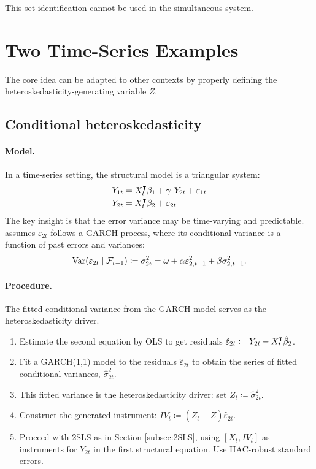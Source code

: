 This set-identification cannot be used in the simultaneous system.

\section{Two Time-Series Examples}

The core idea can be adapted to other contexts by properly defining
the heteroskedasticity-generating variable $Z$.

\subsection{Conditional heteroskedasticity \textcite{prono2014}}

\paragraph{Model.}

In a time-series setting, the structural model is a triangular system:
\begin{align*}
Y_{1t} & =X_{t}^{\intercal}\beta_{1}+\gamma_{1}Y_{2t}+\varepsilon_{1t}\\
Y_{2t} & =X_{t}^{\intercal}\beta_{2}+\varepsilon_{2t}
\end{align*}
The key insight is that the error variance may be time-varying and
predictable. \textcite{prono2014} assumes $\varepsilon_{2t}$ follows
a GARCH process, where its conditional variance is a function of past
errors and variances:
\[
\operatorname{Var}(\varepsilon_{2t}\mid\mathcal{F}_{t-1})\coloneqq\sigma_{2t}^{2}=\omega+\alpha\varepsilon_{2,t-1}^{2}+\beta\sigma_{2,t-1}^{2}.
\]


\paragraph{Procedure.}

The fitted conditional variance from the GARCH model serves as the
heteroskedasticity driver.
\begin{enumerate}
\itemsep2pt
\item Estimate the second equation by OLS to get residuals $\hat{\varepsilon}_{2t}\coloneqq Y_{2t}-X_{t}^{\intercal}\hat{\beta}_{2}$.
\item Fit a GARCH(1,1) model to the residuals $\hat{\varepsilon}_{2t}$
to obtain the series of fitted conditional variances, $\hat{\sigma}_{2t}^{2}$.
\item This fitted variance is the heteroskedasticity driver: set $Z_{t}\coloneqq\hat{\sigma}_{2t}^{2}$.
\item Construct the generated instrument: $IV_{t}\coloneqq(Z_{t}-\bar{Z})\hat{\varepsilon}_{2t}$.
\item Proceed with 2SLS as in Section \ref{subsec:2SLS}, using $[X_{t},IV_{t}]$
as instruments for $Y_{2t}$ in the first structural equation. Use
HAC-robust standard errors.
\end{enumerate}

